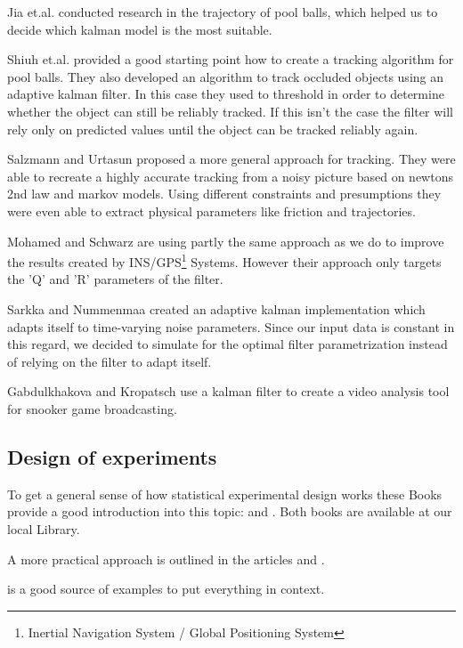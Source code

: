 \documentclass[titlepage, a4paper, 11pt]{scrartcl}
\begin{document}
Jia et.al. \cite{jia} conducted research in the trajectory of pool balls, which helped us to decide which kalman model is the most suitable.

Shiuh et.al. \cite{shiuh} provided a good starting point how to create a tracking algorithm for pool balls. They also developed an algorithm to track occluded objects using an adaptive kalman filter.
In this case they used to threshold in order to determine whether the object can still be reliably tracked. If this isn't the case the filter will rely only on predicted values until the object can be tracked reliably again.

Salzmann and Urtasun \cite{salzmann} proposed a more general approach for tracking. 
They were able to recreate a highly accurate tracking from a noisy picture based on newtons 2nd law and markov models.
Using different constraints and presumptions they were even able to extract physical parameters like friction and trajectories.

Mohamed and Schwarz \cite{schwarz} are using partly the same approach as we do to improve the results created by INS/GPS\footnote{Inertial Navigation System / Global Positioning System} Systems.
However their approach only targets the 'Q' and 'R' parameters of the filter.

Sarkka and Nummenmaa \cite{sarkka} created an adaptive kalman implementation which adapts itself to time-varying noise parameters. Since our input data is constant in this regard,
we decided to simulate for the optimal filter parametrization instead of relying on the filter to adapt itself.

Gabdulkhakova and Kropatsch \cite{kropatsch} use a kalman filter to create a video analysis tool for snooker game broadcasting.

\subsection{Design of experiments}

To get a general sense of how statistical experimental design works these Books provide a good introduction into this topic: \citep{siebertz2017statistische} and \citep{retzlaff1978statistische}.
Both books are available at our local Library.

A more practical approach is outlined in the articles \citep{hoevelmann1993statistische} and \citep{schweitzer1992off}.

\citep{siebertz2017doe} is a good source of examples to put everything in context.
\end{document}
